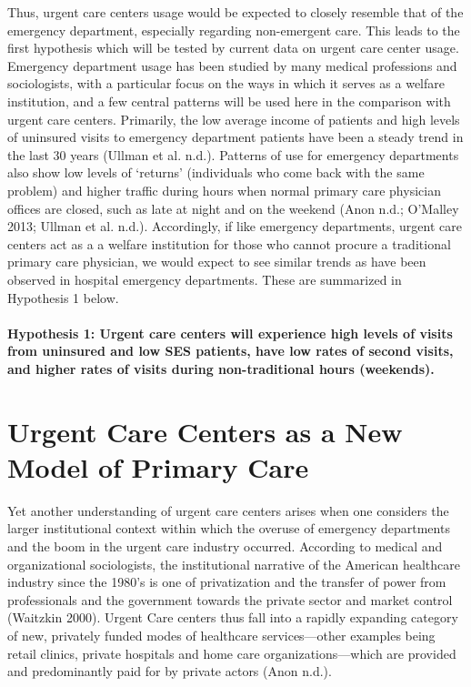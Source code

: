 \documentclass[12pt,twoside]{reedthesis}
\begin{document}
  Thus, urgent care centers usage would be expected to closely resemble
  that of the emergency department, especially regarding non-emergent
  care. This leads to the first hypothesis which will be tested by current
  data on urgent care center usage. Emergency department usage has been
  studied by many medical professions and sociologists, with a particular
  focus on the ways in which it serves as a welfare institution, and a few
  central patterns will be used here in the comparison with urgent care
  centers. Primarily, the low average income of patients and high levels
  of uninsured visits to emergency department patients have been a steady
  trend in the last 30 years (Ullman et al. n.d.). Patterns of use for
  emergency departments also show low levels of `returns' (individuals who
  come back with the same problem) and higher traffic during hours when
  normal primary care physician offices are closed, such as late at night
  and on the weekend (Anon n.d.; O'Malley 2013; Ullman et al. n.d.).
  Accordingly, if like emergency departments, urgent care centers act as a
  a welfare institution for those who cannot procure a traditional primary
  care physician, we would expect to see similar trends as have been
  observed in hospital emergency departments. These are summarized in
  Hypothesis 1 below.
  
  \paragraph{Hypothesis 1: Urgent care centers will experience high levels
  of visits from uninsured and low SES patients, have low rates of second
  visits, and higher rates of visits during non-traditional hours
  (weekends).}\label{hypothesis-1-urgent-care-centers-will-experience-high-levels-of-visits-from-uninsured-and-low-ses-patients-have-low-rates-of-second-visits-and-higher-rates-of-visits-during-non-traditional-hours-weekends.}
  
  \section{Urgent Care Centers as a New Model of Primary
  Care}\label{urgent-care-centers-as-a-new-model-of-primary-care}
  
  Yet another understanding of urgent care centers arises when one
  considers the larger institutional context within which the overuse of
  emergency departments and the boom in the urgent care industry occurred.
  According to medical and organizational sociologists, the institutional
  narrative of the American healthcare industry since the 1980's is one of
  privatization and the transfer of power from professionals and the
  government towards the private sector and market control (Waitzkin
  2000). Urgent Care centers thus fall into a rapidly expanding category
  of new, privately funded modes of healthcare services---other examples
  being retail clinics, private hospitals and home care
  organizations---which are provided and predominantly paid for by private
  actors (Anon n.d.).
  
\end{document}
